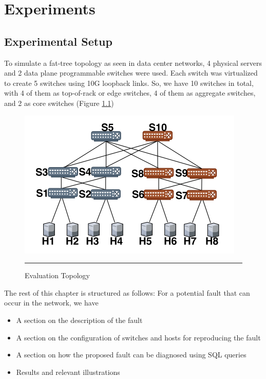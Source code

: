 
\chapter{Experiments} %

\label{Chapter3} %


\section{Experimental Setup}

To simulate a fat-tree topology as seen in data center networks, 4 physical servers and 2 data plane programmable switches were used. Each switch
was virtualized to create 5 switches using 10G loopback links. So, we have 10 switches in total, with 4 of them as top-of-rack or edge switches,
4 of them as aggregate switches, and 2 as core switches (Figure \ref{fig:Topology})

\begin{figure}[htbp]
	\centering
		\includegraphics{Figures/Topology.png}
		\rule{35em}{0.5pt}
	\caption[Evaluation Topology]{Evaluation Topology}
	\label{fig:Topology}
\end{figure}
The rest of this chapter is structured as follows: For a potential fault that can occur in the network, we have
\begin{itemize}
    \item A section on the description of the fault
    \item A section on the configuration of switches and hosts for reproducing the fault
    \item A section on how the proposed fault can be diagnosed using SQL queries
    \item Results and relevant illustrations
\end{itemize}


